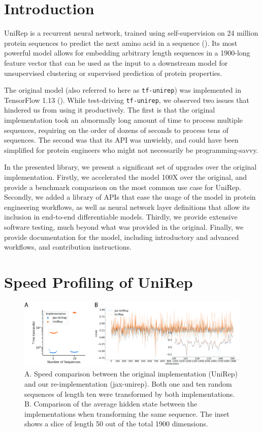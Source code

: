 \documentclass[twoside,11pt]{article}
\begin{document}
\section{Introduction}

UniRep is a recurrent neural network,
trained using self-supervision
on 24 million protein sequences
to predict the next amino acid in a sequence (\cite{alley2019unified}).
Its most powerful model allows for embedding
arbitrary length sequences in a 1900-long feature vector
that can be used as the input to a downstream model
for unsupervised clustering or supervised prediction of protein properties.

The original model (also referred to here as \verb|tf-unirep|)
was implemented in TensorFlow 1.13 (\cite{abadi2016tensorflow}).
While test-driving \verb|tf-unirep|, we observed two issues
that hindered us from using it productively.
The first is that the original implementation
took an abnormally long amount of time to process multiple sequences,
requiring on the order of dozens of seconds to process tens of sequences.
The second was that its API was unwieldy,
and could have been simplified for protein engineers
who might not necessarily be programming-savvy.

In the presented library, we present a significant set of upgrades
over the original implementation.
Firstly, we accelerated the model 100X over the original,
and provide a benchmark comparison on the most common use case for UniRep.
Secondly, we added a library of APIs
that ease the usage of the model in protein engineering workflows,
as well as neural network layer definitions
that allow its inclusion in end-to-end differentiable models.
Thirdly, we provide extensive software testing,
much beyond what was provided in the original.
Finally, we provide documentation for the model,
including introductory and advanced workflows,
and contribution instructions.

\section{Speed Profiling of UniRep}

\begin{figure}[!tpb]
    \centerline{\includegraphics[width=6in]{fig01.jpg}}
    \caption{
        A. Speed comparison between the original implementation (UniRep)
        and our re-implementation (jax-unirep).
        Both one and ten random sequences of length ten
        were transformed by both implementations.
        B. Comparison of the average hidden state between the implementations
        when transforming the same sequence.
        The inset shows a slice of length 50 out of the total 1900 dimensions.
    }
    \label{fig:01}
\end{figure}
\end{document}
